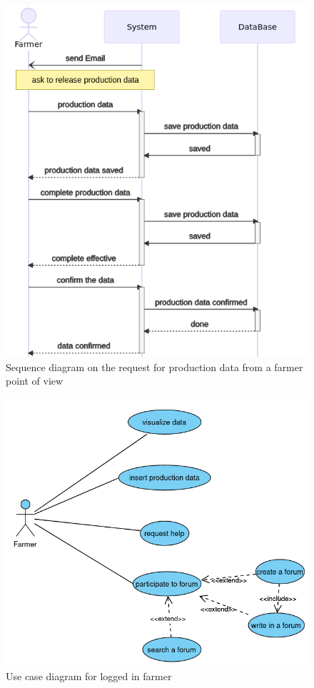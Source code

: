 \begin{figure}
	
	\centering
	
	\includegraphics[width=\textwidth]{Images/seq_request_data.png}
	
	\caption{\label{fig:seqrequestdata} Sequence diagram on the request for production data from a farmer point of view}
	
\end{figure}

\begin{figure}
	\centering
	\includegraphics[width=\textwidth]{Images/use-case-farmer.png}
	\caption{\label{fig:usecasefarmer}Use case diagram for logged in farmer}
\end{figure}


